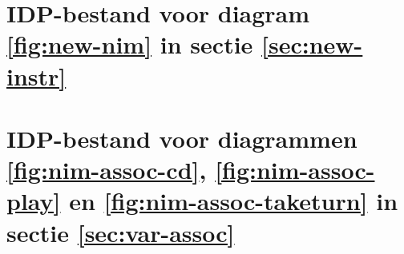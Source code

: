 
\chapter{IDP-bestand voor diagram \ref{fig:new-nim} in sectie \ref{sec:new-instr}}\label{app:new-nim}

\label{code:new-nim}

\chapter{IDP-bestand voor diagrammen \ref{fig:nim-assoc-cd}, \ref{fig:nim-assoc-play} en \ref{fig:nim-assoc-taketurn} in sectie \ref{sec:var-assoc}}\label{app:nim-assoc}

\label{code:nim-assoc}

%
%
%
%
%